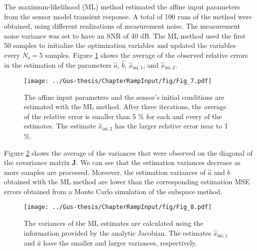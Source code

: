 \documentclass[11pt]{article}
\begin{document}
\begin{itemize}
	\color{blue} 
    The maximum-likelihood (ML) method estimated the affine input parameters from the sensor model transient response.
    A total of 100 runs of the method were obtained, using different realizations of measurement noise.
    The measurement noise variance was set to have an SNR of 40 dB.
    The ML method used the first 50 samples to initialize the optimization variables and updated the variables every $N_{\mathrm{s}} = 5$ samples.
    Figure \ref{fig:rele_lo_40dB_s10} shows the average of the observed relative errors in the estimation of the parameters $\widehat{a}$, $\widehat{b}$, $\widehat{x}_{\mathrm{ini,1}}$, and $\widehat{x}_{\mathrm{ini,2}}$.
    
    \renewcommand{\thefigure}{6.8}
    \begin{figure}[!htbp]
    \centering
    \texttt{[image: ../Gus-thesis/ChapterRampInput/fig/Fig\_7.pdf]} 
    \caption{ \label{fig:rele_lo_40dB_s10} The affine input parameters and the sensor's initial conditions are estimated with the ML method. After three iterations, \color{blue} the average of the relative error is smaller than 5 \% for each and every of the estimates. The estimate $\widehat{x}_{\mathrm{ini,2}}$ has the larger relative error near to 1 \%. \color{black} }
    \end{figure}

    Figure \ref{fig:cov_lo_40dB_s1} shows \color{blue} the average \color{black} of the variances that were observed on the diagonal of the covariance matrix $\mathbf{J}$. 
    We can see that the estimation variances decrease as more samples are processed.
    Moreover, the estimation variances of $\widehat{a}$ and $\widehat{b}$ obtained with the ML method are lower than the corresponding estimation MSE errors obtained from a Monte Carlo simulation of the subspace method.

    \renewcommand{\thefigure}{6.9}
    \begin{figure}[!htbp]
    \centering
    \texttt{[image: ../Gus-thesis/ChapterRampInput/fig/Fig\_8.pdf]} 
    \caption{ \label{fig:cov_lo_40dB_s1} The variances of the ML estimates are calculated using the information provided by the analytic Jacobian. \color{blue} The estimates $\widehat{x}_{\mathrm{ini,1}}$ and $\widehat{a}$ have the smaller and larger variances, respectively. \color{black}  }
    \end{figure}

    \color{black} 

\end{itemize}
\end{document}
